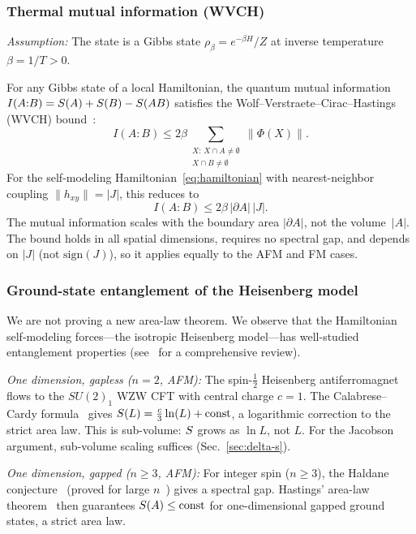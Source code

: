 \subsubsection{Thermal mutual information (WVCH)}
\label{sec:wvch}

\emph{Assumption:}  The state is a Gibbs state
$\rho_\beta = e^{-\beta H}/Z$ at inverse temperature
$\beta = 1/T > 0$.

For any Gibbs state of a local Hamiltonian, the quantum mutual
information $I(A{:}B) = S(A) + S(B) - S(AB)$ satisfies
the Wolf--Verstraete--Cirac--Hastings (WVCH)
bound~\cite{WVCH2008}:
\begin{equation}
  I(A{:}B) \leq 2\beta \sum_{\substack{X :\, X \cap A \neq \emptyset \\
  X \cap B \neq \emptyset}} \|\Phi(X)\|.
  \label{eq:wvch-general}
\end{equation}
For the self-modeling Hamiltonian~\eqref{eq:hamiltonian} with
nearest-neighbor coupling $\|h_{xy}\| = |J|$, this reduces to
\begin{equation}
  \boxed{I(A{:}B) \leq 2\beta\, |\partial A|\, |J|.}
  \label{eq:wvch-bound}
\end{equation}
The mutual information scales with the boundary area $|\partial A|$,
not the volume~$|A|$.  The bound holds in all spatial
dimensions, requires no spectral gap, and depends on $|J|$ (not
$\mathrm{sign}(J)$), so it applies equally to the AFM and FM cases.

\subsubsection{Ground-state entanglement of the Heisenberg model}
\label{sec:heisenberg-arealaw}

We are not proving a new area-law theorem.  We observe that the
Hamiltonian self-modeling forces---the isotropic Heisenberg
model---has well-studied entanglement properties
(see~\cite{EisertCramerPlenio2010} for a comprehensive review).

\emph{One dimension, gapless ($n = 2$, AFM):}  The spin-$\tfrac{1}{2}$
Heisenberg antiferromagnet flows to the $SU(2)_1$ WZW CFT with central
charge $c = 1$.  The Calabrese--Cardy
formula~\cite{CalabreseCardy2004} gives
$S(L) = \tfrac{c}{3}\ln(L) + \mathrm{const}$, a logarithmic
correction to the strict area law.  This is sub-volume: $S$ grows
as $\ln L$, not $L$.  For the Jacobson argument, sub-volume scaling
suffices (Sec.~\ref{sec:delta-s}).

\emph{One dimension, gapped ($n \geq 3$, AFM):}  For integer spin
($n \geq 3$), the Haldane conjecture~\cite{Haldane1983} (proved for
large $n$~\cite{AffleckKennedyLiebTasaki1987}) gives a spectral gap.
Hastings' area-law theorem~\cite{Hastings2007} then guarantees
$S(A) \leq \mathrm{const}$ for one-dimensional gapped ground
states, a strict area law.

